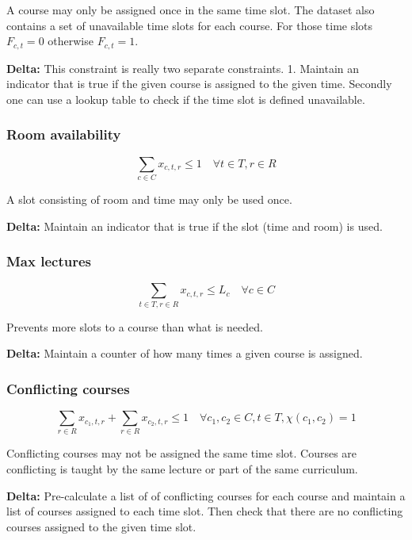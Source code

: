 A course may only be assigned once in the same time slot. The dataset also contains a set of unavailable time slots for each course. For those time slots $F_{c, t} = 0$ otherwise $F_{c, t} = 1$.

\textbf{Delta:} This constraint is really two separate constraints. 1. Maintain an indicator that is true if the given course is assigned to the given time. Secondly one can use a lookup table to check if the time slot is defined unavailable.

\subsubsection{Room availability}
\begin{equation}
    \sum_{c \in C} x_{c, t, r} \le 1 \quad \forall t \in T, r \in R
\end{equation}

A slot consisting of room and time may only be used once.

\textbf{Delta:} Maintain an indicator that is true if the slot (time and room) is used.

\subsubsection{Max lectures}
\begin{equation}
\sum_{t \in T, r \in R} x_{c, t, r} \le L_c \quad \forall c \in C
\end{equation}

Prevents more slots to a course than what is needed.

\textbf{Delta: } Maintain a counter of how many times a given course is assigned.

\subsubsection{Conflicting courses}
\begin{equation}
\sum_{r \in R} x_{c_1, t, r} + \sum_{r \in R} x_{c_2, t, r} \le 1 \quad \forall c_1, c_2 \in C, t \in T, \chi(c_1, c_2) = 1
\end{equation}

Conflicting courses may not be assigned the same time slot. Courses are conflicting is taught by the same lecture or part of the same curriculum.

\textbf{Delta: } Pre-calculate a list of of conflicting courses for each course and maintain a list of courses assigned to each time slot. Then check that there are no conflicting courses assigned to the given time slot.

